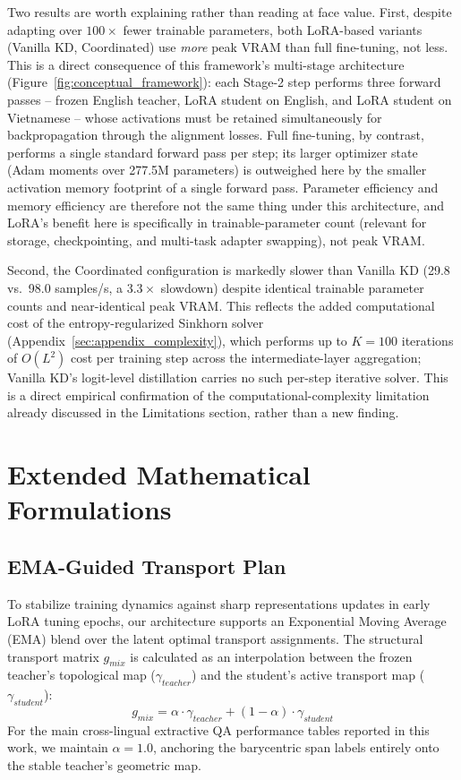 \documentclass[11pt]{article}
\begin{document}
Two results are worth explaining rather than reading at face value. First, despite adapting over $100\times$ fewer trainable parameters, both LoRA-based variants (Vanilla KD, Coordinated) use \emph{more} peak VRAM than full fine-tuning, not less. This is a direct consequence of this framework's multi-stage architecture (Figure~\ref{fig:conceptual_framework}): each Stage-2 step performs three forward passes -- frozen English teacher, LoRA student on English, and LoRA student on Vietnamese -- whose activations must be retained simultaneously for backpropagation through the alignment losses. Full fine-tuning, by contrast, performs a single standard forward pass per step; its larger optimizer state (Adam moments over 277.5M parameters) is outweighed here by the smaller activation memory footprint of a single forward pass. Parameter efficiency and memory efficiency are therefore not the same thing under this architecture, and LoRA's benefit here is specifically in trainable-parameter count (relevant for storage, checkpointing, and multi-task adapter swapping), not peak VRAM.

Second, the Coordinated configuration is markedly slower than Vanilla KD (29.8 vs.\ 98.0 samples/s, a $3.3\times$ slowdown) despite identical trainable parameter counts and near-identical peak VRAM. This reflects the added computational cost of the entropy-regularized Sinkhorn solver (Appendix~\ref{sec:appendix_complexity}), which performs up to $K=100$ iterations of $O(L^2)$ cost per training step across the intermediate-layer aggregation; Vanilla KD's logit-level distillation carries no such per-step iterative solver. This is a direct empirical confirmation of the computational-complexity limitation already discussed in the Limitations section, rather than a new finding.

\section{Extended Mathematical Formulations}
\label{sec:appendix_math}

\subsection{EMA-Guided Transport Plan}
To stabilize training dynamics against sharp representations updates in early LoRA tuning epochs, our architecture supports an Exponential Moving Average (EMA) blend over the latent optimal transport assignments. The structural transport matrix $g_{mix}$ is calculated as an interpolation between the frozen teacher's topological map ($\gamma_{teacher}$) and the student's active transport map ($\gamma_{student}$):
$$ g_{mix} = \alpha \cdot \gamma_{teacher} + (1 - \alpha) \cdot \gamma_{student} $$
For the main cross-lingual extractive QA performance tables reported in this work, we maintain $\alpha = 1.0$, anchoring the barycentric span labels entirely onto the stable teacher's geometric map.
\end{document}
